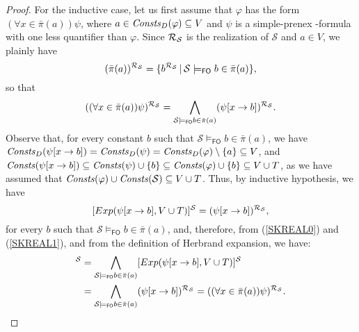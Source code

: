 \documentclass[a4paper]{llncs}
\newcommand{\HExp}{Exp}
\newcommand{\nonpairssym}{\bar{\pi}}
\newcommand{\nonpairs}[1]{\nonpairssym(#1)}
\newcommand{\atset}{\mathcal{S}}
\newcommand{\DomConsts}{\Consts_D}
\newcommand{\consta}{a}
\newcommand{\constb}{b}
\newcommand{\subst}[3]{#1[#2\rightarrow#3]}
\newcommand{\fomodels}[2]{#1 \models_{\mathsf{FO}} #2}
\begin{document}
\begin{proof}
For the inductive case, let us first assume that $\varphi$ has the 
form $(\forall x \in \nonpairs{\consta})\psi$, where $a \in 
\DomConsts(\varphi) \subseteq V$ and $\psi$ is a simple-prenex 
\Forallpizero-formula with one less quantifier than $\varphi$.
%
Since $\Realization_{\!\atset}$ is the realization of $\atset$ and $a 
\in V$, we plainly have
\begin{equation}\label{SKREAL0}
(\nonpairs{\consta})^{\Realization_{\!\atset}} = \{ 
\constb^{\Realization_{\!\atset}} \,|\,
\fomodels{\atset}{\constb \in \nonpairs{\consta}} \},
\end{equation}
so that
\begin{equation}\label{SKREAL1}
((\forall x \in \nonpairs{\consta})\psi)^{\Realization_{\!\atset}} = 
\bigwedge\limits_{\fomodels{\atset}{\constb \in \nonpairs{\consta}}} 
(\subst{\psi}{x}{\constb})^{\Realization_{\!\atset}}.
\end{equation}
%
Observe that, for every constant $\constb$ such that
$\fomodels{\atset}{\constb \in \nonpairs{\consta}}$, we have
$\DomConsts(\subst{\psi}{x}{\constb}) = \DomConsts(\psi) =
\DomConsts(\varphi) \setminus \{\consta\} \subseteq V$, and
$\Consts(\subst{\psi}{x}{\constb}) \subseteq \Consts(\psi) \cup \{\constb\}
\subseteq \Consts(\varphi) \cup \{\constb\} \subseteq V \cup T$, as
we have assumed that $\Consts(\varphi) \cup \Consts(\atset) \subseteq 
V \cup T$.
Thus, by inductive hypothesis, we have
\[
   [\HExp(\subst{\psi}{x}{\constb}, V \cup T)]^{\atset} = 
(\subst{\psi}{x}{\constb})^{\Realization_{\!\atset}} ,
\]
for every $\constb$ such that $\fomodels{\atset}{\constb \in 
\nonpairs{\consta}}$, and, therefore, from (\ref{SKREAL0}) and 
(\ref{SKREAL1}), and from the definition of Herbrand expansion, we 
have:
\begin{align*}
  [\HExp((\forall x \in \nonpairs{\consta})\psi, V \cup T)]^{\atset} &=
  \bigwedge\limits_{\fomodels{\atset}{\constb \in 
\nonpairs{\consta}}}[\HExp(\subst{\psi}{x}{\constb}, V \cup 
T)]^{\atset}  \\
&=  \bigwedge\limits_{\fomodels{\atset}{\constb \in 
\nonpairs{\consta}}} 
(\subst{\psi}{x}{\constb})^{\Realization_{\!\atset}} =
   ((\forall x \in \nonpairs{\consta})\psi)^{\Realization_{\!\atset}} .
\end{align*}


\end{proof}
\end{document}
